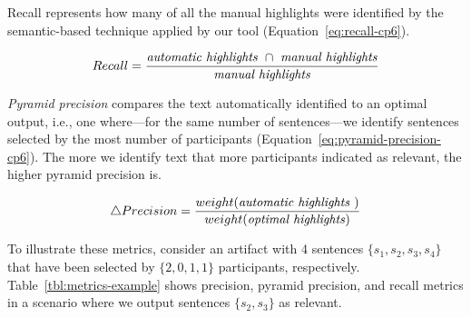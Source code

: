 Recall represents how many of all the manual highlights were identified by the semantic-based technique applied by our tool (Equation~\ref{eq:recall-cp6}). 



\smallskip
\begin{small}
\begin{equation}
    Recall = \frac{
        \text{\textit{automatic highlights}~} \cap 
        \text{~\textit{manual highlights}}
    }{\text{\textit{manual highlights}}}
\label{eq:recall-cp6}    
\end{equation}
\end{small}

\medskip


\textit{Pyramid precision} compares the text automatically identified to an optimal output, i.e., one where---for the same number of sentences---we identify sentences selected by the most number of participants (Equation~\ref{eq:pyramid-precision-cp6}). The more we identify text that more participants indicated as relevant, the higher pyramid precision is.



\smallskip
\begin{small}
\begin{equation}
    \triangle Precision = \frac{
        weight(\text{\textit{automatic highlights}~})
    }{weight(\text{\textit{optimal highlights}})}
\label{eq:pyramid-precision-cp6}    
\end{equation}
\end{small}
    


To illustrate these metrics, consider an artifact with 4 sentences $\{s_1, s_2, s_3, s_4\}$ that have been selected by $\{2, 0, 1, 1\}$ participants, respectively.
Table~\ref{tbl:metrics-example} shows precision, pyramid precision, and recall metrics in a scenario where we output sentences $\{s_2, s_3\}$ as relevant.
    








